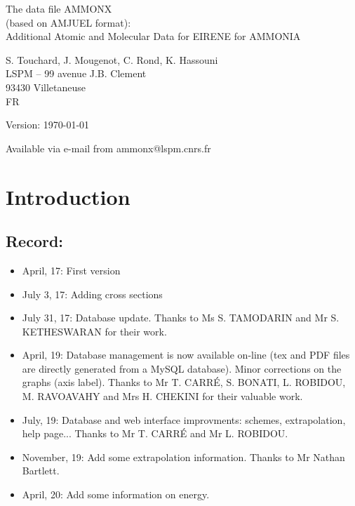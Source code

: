 \documentclass[12pt,dvipdfm]{article}
\begin{document}
\parindent 0pt
{\Large \bf \center
\vspace*{3truecm}

The data file AMMONX \\(based on AMJUEL format):\\
Additional Atomic and Molecular Data for EIRENE for AMMONIA
\vspace*{3truecm}

S. Touchard, J. Mougenot, C. Rond, K. Hassouni\\
LSPM -- 99 avenue J.B. Clement\\
93430 Villetaneuse \\
FR
\vspace{5truecm}

Version: \today
\vspace{3truecm}

Available via e-mail from ammonx@lspm.cnrs.fr
}
\tableofcontents
\newpage
\section*{Introduction}

\subsection*{Record:}
\begin{itemize}
\item April, 17:  First version
\item July 3, 17: Adding cross sections
\item July 31, 17: Database update. Thanks to Ms S. TAMODARIN and Mr S. KETHESWARAN for their work.
\item April, 19: Database management is now available on-line (tex and PDF files are directly generated from a MySQL database). Minor corrections on the graphs (axis label). Thanks to Mr T. CARRÉ, S. BONATI, L. ROBIDOU, M. RAVOAVAHY and Mrs H. CHEKINI for their valuable work.
\item July, 19: Database and web interface improvments: schemes, extrapolation, help page... Thanks to Mr T. CARRÉ and Mr L. ROBIDOU.
\item November, 19: Add some extrapolation information. Thanks to Mr Nathan Bartlett.
\item April, 20: Add some information on energy.
\end{itemize}
\end{document}
